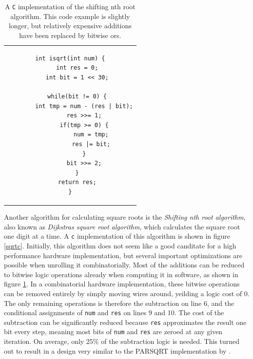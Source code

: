			\begin{table}
				\centering
				\caption{A \texttt{C} implementation of the shifting nth root
					algorithm. This code example is slightly longer, but
					relatively expensive additions have been replaced by
					bitwise ors.}
				\label{sqrtcopt}
				\begin{tabular}{c}
				\begin{lstlisting}
int isqrt(int num) {
    int res = 0;
    int bit = 1 << 30;

    while(bit != 0) {
    	int tmp = num - (res | bit);
    	res >>= 1;
        if(tmp >= 0) {
            num = tmp;
            res |= bit;
        }
        bit >>= 2;
    }
    return res;
}
				\end{lstlisting}
				\end{tabular}
			\end{table}

			Another algorithm for calculating square roots is the
			\emph{Shifting nth root algorithm}, also known as \emph{Dijkstras
			square root algorithm}, which calculates the square root one digit
			at a time. A \texttt{c} implementation of this algorithm is shown
			in figure \ref{sqrtc}. Initially, this algorithm does not seem like
			a good canditate for a high performance hardware implementation,
			but several important optimizations are possible when unrolling it
			combinatorially. Most of the additions can be reduced to bitwise
			logic operations already when computing it in software, as shown in
			figure \ref{sqrtcopt}. In a combinatorial hardware implementation,
			these bitwise operations can be removed entirely by simply moving
			wires around, yeilding a logic cost of 0. The only remaining
			operations is therefore the subtraction on line 6, and the
			conditional assignments of \texttt{num} and \texttt{res} on lines 9
			and 10. The cost of the subtraction can be significantly reduced
			because \texttt{res} approximates the result one bit every step,
			meaning most bits of \texttt{num} and \texttt{res} are zeroed at any
			given iteration. On average, only 25\% of the subtraction logic is 
			needed. This turned out to result in a design very similar to the 
			PARSQRT implementation by \cite{japaneseSQRT}.
